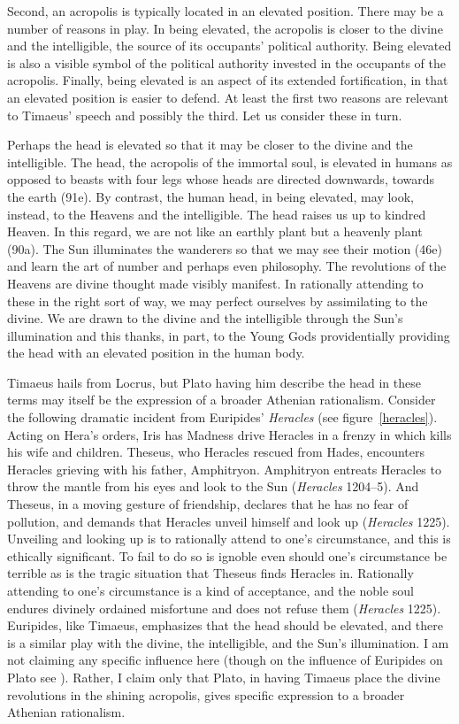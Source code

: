 Second, an acropolis is typically located in an elevated position. There may be a number of reasons in play. In being elevated, the acropolis is closer to the divine and the intelligible, the source of its occupants' political authority. Being elevated is also a visible symbol of the political authority invested in the occupants of the acropolis. Finally, being elevated is an aspect of its extended fortification, in that an elevated position is easier to defend. At least the first two reasons are relevant to Timaeus' speech and possibly the third. Let us consider these in turn.

Perhaps the head is elevated so that it may be closer to the divine and the intelligible. The head, the acropolis of the immortal soul, is elevated in humans as opposed to beasts with four legs whose heads are directed downwards, towards the earth (91e). By contrast, the human head, in being elevated, may look, instead, to the Heavens and the intelligible. The head raises us up to kindred Heaven. In this regard, we are not like an earthly plant but a heavenly plant (90a). The Sun illuminates the wanderers so that we may see their motion (46e) and learn the art of number and perhaps even philosophy. The revolutions of the Heavens are divine thought made visibly manifest. In rationally attending to these in the right sort of way, we may perfect ourselves by assimilating to the divine. We are drawn to the divine and the intelligible through the Sun's illumination and this thanks, in part, to the Young Gods providentially providing the head with an elevated position in the human body. 

Timaeus hails from Locrus, but Plato having him describe the head in these terms may itself be the expression of a broader Athenian rationalism. Consider the following dramatic incident from Euripides' \emph{Heracles} (see figure~\ref{heracles}). Acting on Hera's orders, Iris has Madness drive Heracles in a frenzy in which kills his wife and children. Theseus, who Heracles rescued from Hades, encounters Heracles grieving with his father, Amphitryon. Amphitryon entreats Heracles to throw the mantle from his eyes and look to the Sun (\emph{Heracles} 1204--5). And Theseus, in a moving gesture of friendship, declares that he has no fear of pollution, and demands that Heracles unveil himself and look up (\emph{Heracles} 1225). Unveiling and looking up is to rationally attend to one's circumstance, and this is ethically significant. To fail to do so is ignoble even should one's circumstance be terrible as is the tragic situation that Theseus finds Heracles in. Rationally attending to one's circumstance is a kind of acceptance, and the noble soul endures divinely ordained misfortune and does not refuse them (\emph{Heracles} 1225). Euripides, like Timaeus, emphasizes that the head should be elevated, and there is a similar play with the divine, the intelligible, and the Sun's illumination. I am not claiming any specific influence here (though on the influence of Euripides on Plato see \citealt{Sansone:1996ux}). Rather, I claim only that Plato, in having Timaeus place the divine revolutions in the shining acropolis, gives specific expression to a broader Athenian rationalism.


